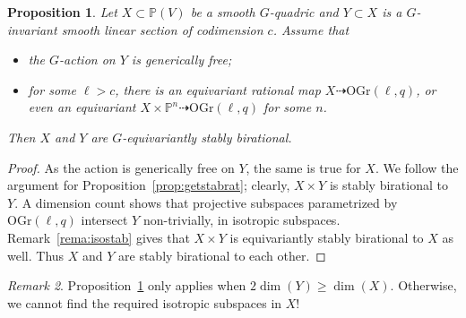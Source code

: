 \documentclass[12pt]{amsart}
\numberwithin{equation}{section}
\newcommand{\bP}{\mathbb{P}}
\newcommand{\OGr}{\mathrm{OGr}}
\theoremstyle{plain}
\newtheorem{prop}{Proposition}[section]
\theoremstyle{definition}
\theoremstyle{remark}
\newtheorem{rema}[prop]{Remark}
\begin{document}
\begin{prop} \label{prop:whyPfister}
Let $X\subset \bP(V)$ be a smooth $G$-quadric and 
$Y \subset X$ is a $G$-invariant smooth linear section
of codimension $c$. Assume that
\begin{itemize}
\item{the $G$-action on $Y$ is generically free;}
\item{for some $\ell>c$, there is an equivariant rational
map $X \dashrightarrow \OGr(\ell,q)$, or even an equivariant
$X \times \bP^n \dashrightarrow \OGr(\ell,q)$ for some $n$.}
\end{itemize}
Then $X$ and $Y$ are $G$-equivariantly stably birational.
\end{prop}
\begin{proof}
As the action is generically free on $Y$, the same
is true for $X$. We follow the argument for Proposition~\ref{prop:getstabrat}; clearly, $X\times Y$
is stably birational to $Y$.
A dimension count
shows that projective subspaces parametrized by
$\OGr(\ell,q)$ intersect $Y$
non-trivially, in isotropic subspaces. 
Remark~\ref{rema:isostab} gives that $X\times Y$ 
is equivariantly stably birational to $X$ as well. 
Thus $X$ and $Y$ are stably birational to each other.
\end{proof}
\begin{rema}
Proposition~\ref{prop:whyPfister} only applies
when $2\dim(Y)\ge \dim(X)$. Otherwise, we cannot
find the required isotropic subspaces in $X$!
\end{rema}
\end{document}

